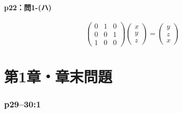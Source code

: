\documentclass[a4paper,10pt,fleqn]{ltjsarticle}
\begin{document}
\subsection*{p22：問1-(ハ)}

\begin{tleftbar}
  \[
    \begin{pmatrix}
      0 & 1 & 0 \\
      0 & 0 & 1 \\
      1 & 0 & 0
    \end{pmatrix}
    \begin{pmatrix}
      x \\
      y \\
      z
    \end{pmatrix}
    =\begin{pmatrix}
      y \\
      z \\
      x
    \end{pmatrix}
  \]
\end{tleftbar}


\setcounter{equation}{0}

\part*{第1章・章末問題}


\section*{p29--30:1}
\end{document}
